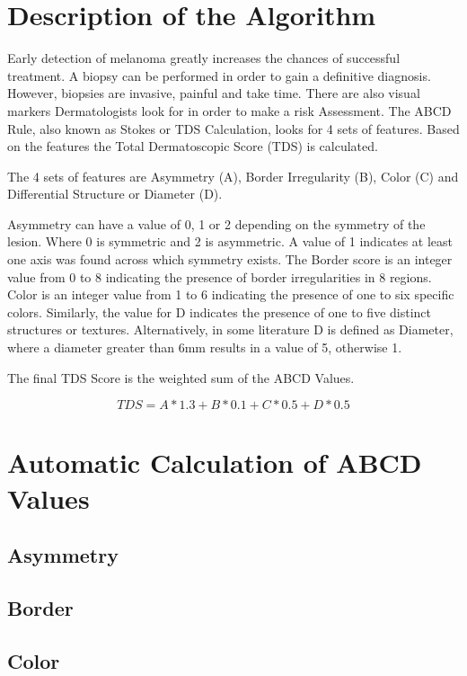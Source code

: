 \section{Description of the Algorithm}

Early detection of melanoma greatly increases the chances of successful treatment. A biopsy can be performed in order to gain a definitive diagnosis. However, biopsies are invasive, painful and take time. There are also visual markers Dermatologists look for in order to make a risk Assessment. The ABCD Rule, also known as Stokes or TDS Calculation, looks for 4 sets of features. Based on the features the Total Dermatoscopic Score (TDS) is calculated.

The 4 sets of features are Asymmetry (A), Border Irregularity (B), Color (C) and Differential Structure or Diameter (D).

Asymmetry can have a value of 0, 1 or 2 depending on the symmetry of the lesion. Where 0 is symmetric and 2 is asymmetric. A value of 1 indicates at least one axis was found across which symmetry exists. The Border score is an integer value from 0 to 8 indicating the presence of border irregularities in 8 regions. Color is an integer value from 1 to 6 indicating the presence of one to six specific colors. Similarly, the value for D indicates the presence of one to five distinct structures or textures. Alternatively, in some literature\cite{Siddiq_2015} D is defined as Diameter, where a diameter greater than 6mm results in a value of 5, otherwise 1.

The final TDS Score is the weighted sum of the ABCD Values.

\begin{equation}
TDS = A * 1.3 + B * 0.1 + C * 0.5 + D * 0.5
\end{equation}

\section{Automatic Calculation of ABCD Values}
\subsection{Asymmetry}



\subsection{Border}
\subsection{Color}
